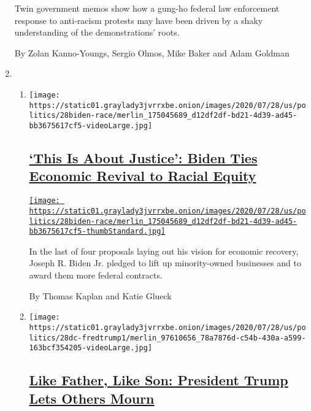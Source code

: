 \begin{enumerate}
  Twin government memos show how a gung-ho federal law enforcement
  response to anti-racism protests may have been driven by a shaky
  understanding of the demonstrations' roots.

  By Zolan Kanno-Youngs, Sergio Olmos, Mike Baker and Adam Goldman
\item
  \begin{enumerate}
  \def\labelenumii{\arabic{enumii}.}
  \item
    \texttt{[image: https://static01.graylady3jvrrxbe.onion/images/2020/07/28/us/politics/28biden-race/merlin\_175045689\_d12df2df-bd21-4d39-ad45-bb3675617cf5-videoLarge.jpg]}

    \hypertarget{this-is-about-justice-biden-ties-economic-revival-to-racial-equity}{%
    \subsection{\texorpdfstring{\href{/2020/07/28/us/politics/joe-biden-racial-justice-economy-plan.html}{`This
    Is About Justice': Biden Ties Economic Revival to Racial
    Equity}}{`This Is About Justice': Biden Ties Economic Revival to Racial Equity}}\label{this-is-about-justice-biden-ties-economic-revival-to-racial-equity}}

    \href{/2020/07/28/us/politics/joe-biden-racial-justice-economy-plan.html}{\texttt{[image: https://static01.graylady3jvrrxbe.onion/images/2020/07/28/us/politics/28biden-race/merlin\_175045689\_d12df2df-bd21-4d39-ad45-bb3675617cf5-thumbStandard.jpg]}}

    In the last of four proposals laying out his vision for economic
    recovery, Joseph R. Biden Jr. pledged to lift up minority-owned
    businesses and to award them more federal contracts.

    By Thomas Kaplan and Katie Glueck
  \item
    \texttt{[image: https://static01.graylady3jvrrxbe.onion/images/2020/07/28/us/politics/28dc-fredtrump1/merlin\_97610656\_78a7876d-c54b-430a-a599-163bcf354205-videoLarge.jpg]}

    \hypertarget{like-father-like-son-president-trump-lets-others-mourn}{%
    \subsection{\texorpdfstring{\href{/2020/07/28/us/politics/donald-fred-trump.html}{Like
    Father, Like Son: President Trump Lets Others
    Mourn}}{Like Father, Like Son: President Trump Lets Others Mourn}}\label{like-father-like-son-president-trump-lets-others-mourn}}


\end{enumerate}
\end{enumerate}

